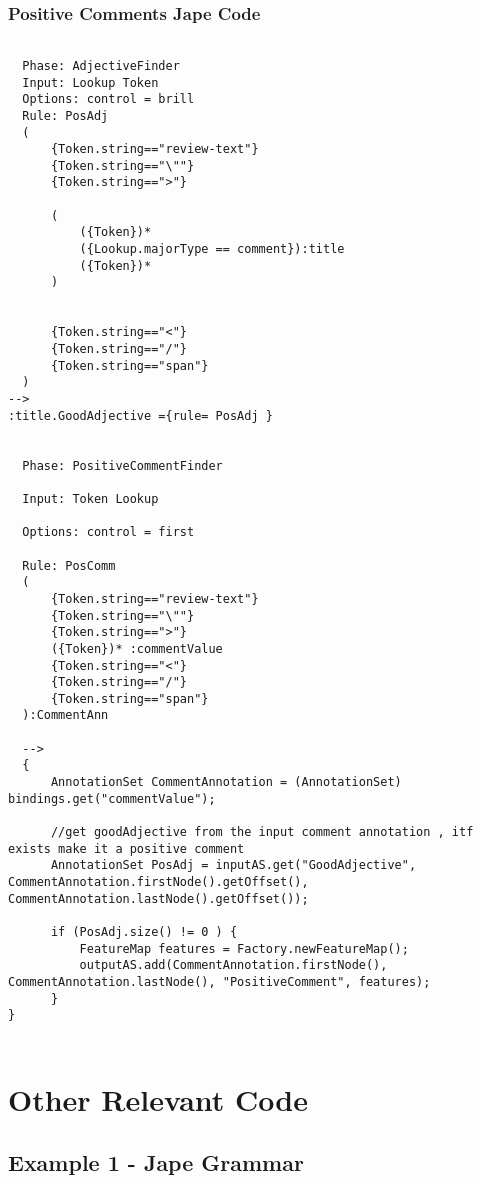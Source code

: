 \documentclass[a4paper,12pt]{report}
\begin{document}
\subsection{Positive Comments Jape Code}
\label{sec:jape3}
  \begin{lstlisting}
  
  Phase: AdjectiveFinder
  Input: Lookup Token
  Options: control = brill
  Rule: PosAdj
  (
	  {Token.string=="review-text"}
	  {Token.string=="\""}
	  {Token.string==">"}
	  
	  (
		  ({Token})*
		  ({Lookup.majorType == comment}):title
		  ({Token})*
	  )

	  
	  {Token.string=="<"}
	  {Token.string=="/"}
	  {Token.string=="span"}
  )
-->
:title.GoodAdjective ={rule= PosAdj }
  
  
  Phase: PositiveCommentFinder

  Input: Token Lookup

  Options: control = first

  Rule: PosComm
  (
	  {Token.string=="review-text"}
	  {Token.string=="\""}
	  {Token.string==">"}
	  ({Token})* :commentValue
	  {Token.string=="<"}
	  {Token.string=="/"}
	  {Token.string=="span"}
  ):CommentAnn
  
  -->
  {
	  AnnotationSet CommentAnnotation = (AnnotationSet) bindings.get("commentValue");
	  
	  //get goodAdjective from the input comment annotation , itf exists make it a positive comment
	  AnnotationSet PosAdj = inputAS.get("GoodAdjective", CommentAnnotation.firstNode().getOffset(), CommentAnnotation.lastNode().getOffset());
	  
	  if (PosAdj.size() != 0 ) {
		  FeatureMap features = Factory.newFeatureMap();                  
		  outputAS.add(CommentAnnotation.firstNode(), CommentAnnotation.lastNode(), "PositiveComment", features);
	  }
}
 
  \end{lstlisting}




\chapter{Other Relevant Code}


\section{Example 1 - Jape Grammar}
\label{sec:background}
\end{document}
